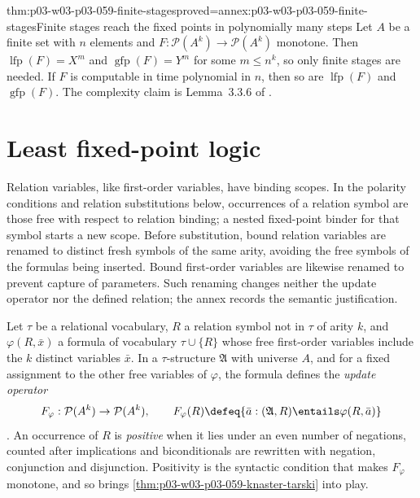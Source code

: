 \begin{hblemma}{thm:p03-w03-p03-059-finite-stages}{proved=annex:p03-w03-p03-059-finite-stages}{Finite stages reach the fixed points in polynomially many steps}
Let \(A\) be a finite set with \(n\) elements and
\(F:\mathcal P(A^k)\to\mathcal P(A^k)\) monotone. Then
\(\operatorname{lfp}(F)=X^m\) and \(\operatorname{gfp}(F)=Y^m\) for some
\(m\leq n^k\), so only finite stages are needed. If \(F\) is computable in
time polynomial in \(n\), then so are \(\operatorname{lfp}(F)\) and
\(\operatorname{gfp}(F)\). The complexity claim is Lemma~3.3.6 of
\cite[p.~155]{Gradel2007FMTDescriptiveChapter}.
\end{hblemma}

\section{Least fixed-point logic}
\label{sec:p03-w03-p03-059-lfp}

Relation variables, like first-order variables, have binding scopes. In the
polarity conditions and relation substitutions below, occurrences of a
relation symbol are those free with respect to relation binding; a nested
fixed-point binder for that symbol starts a new scope. Before substitution,
bound relation variables are renamed to distinct fresh symbols of the same
arity, avoiding the free symbols of the formulas being inserted. Bound
first-order variables are likewise renamed to prevent capture of parameters.
Such renaming changes neither the update operator nor the defined relation;
the annex records the semantic justification.

Let \(\tau\) be a relational vocabulary, \(R\) a relation symbol not in
\(\tau\) of arity \(k\), and \(\varphi(R,\bar x)\) a formula of vocabulary
\(\tau\cup\{R\}\) whose free first-order variables include the \(k\)
distinct variables \(\bar x\). In a \(\tau\)-structure \(\mathfrak A\) with
universe \(A\), and for a fixed assignment to the other free variables of
\(\varphi\), the formula defines the \emph{update operator}
\[
 F_\varphi:\mathcal P(A^k)\to\mathcal P(A^k),\qquad
 F_\varphi(R)\defeq\{\bar a:(\mathfrak A,R)\entails\varphi(R,\bar a)\}
\]
\cite[p.~152]{Gradel2007FMTDescriptiveChapter}. An occurrence of \(R\) is \emph{positive}
when it lies under an even number of negations, counted after implications
and biconditionals are rewritten with negation, conjunction and
disjunction. Positivity is the syntactic condition that makes
\(F_\varphi\) monotone, and so brings
\cref{thm:p03-w03-p03-059-knaster-tarski} into play.

